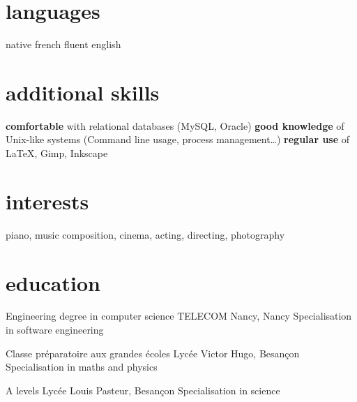\documentclass[]{lemaki-cv}
\begin{document}
\begin{aside}
		\section{languages}
		\footnotesize native french
		\footnotesize fluent english
		\section{additional skills}
		\footnotesize\textbf{comfortable} with relational databases (MySQL, Oracle)
		\footnotesize\textbf{good knowledge} of Unix-like systems (Command line usage, process
		management\ldots)
		\footnotesize\textbf{regular use} of LaTeX, Gimp, Inkscape
		\section{interests}
		\footnotesize piano, music composition, cinema, acting, directing, photography
	\end{aside}

		\emph{\small}


		\section{education}

		\begin{entrylist}


			{Engineering degree {\normalfont{}in computer science}}
			{TELECOM Nancy, Nancy}
			{Specialisation in software engineering}


			{Classe préparatoire aux grandes écoles}
			{Lycée Victor Hugo, Besançon}
			{Specialisation in maths and physics}


			{A levels}
			{Lycée Louis Pasteur, Besançon}
			{Specialisation in science}


		\end{entrylist}
\end{document}
